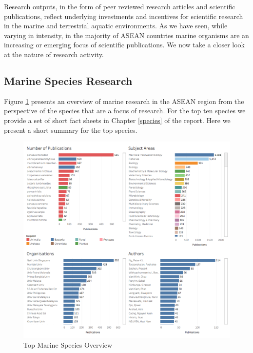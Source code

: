 \documentclass[openany]{book}
\theoremstyle{definition}
\theoremstyle{definition}
\theoremstyle{definition}
\theoremstyle{remark}
\begin{document}
Research outputs, in the form of peer reviewed research articles and
scientific publications, reflect underlying investments and incentives
for scientific research in the marine and terrestrial aquatic
environments. As we have seen, while varying in intensity, in the
majority of ASEAN countries marine organisms are an increasing or
emerging focus of scientific publications. We now take a closer look at
the nature of research activity.

\hypertarget{marine-species-research}{%
\subsection{Marine Species Research}\label{marine-species-research}}

Figure \ref{fig:taxonomysubjectarea} presents an overview of marine
research in the ASEAN region from the perspective of the species that
are a focus of research. For the top ten species we provide a set of
short fact sheets in Chapter \ref{species} of the report. Here we
present a short summary for the top species.

\begin{figure}

{\centering \includegraphics[width=1\linewidth]{images/aseanmarinlit_species_overview} 

}

\caption{Top Marine Species Overview}\label{fig:taxonomysubjectarea}
\end{figure}
\end{document}
